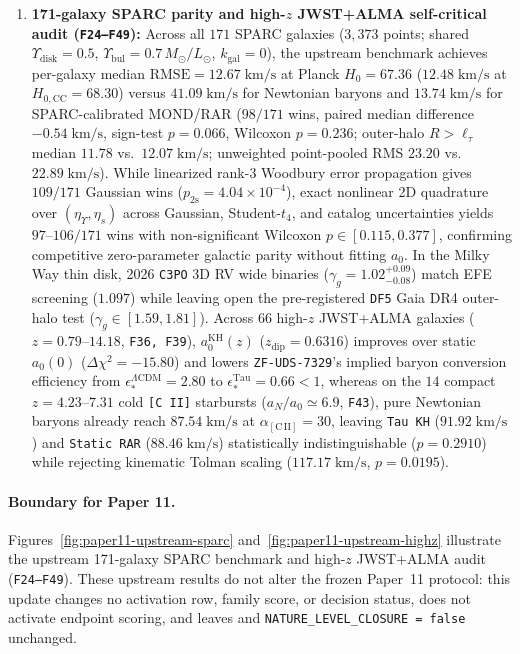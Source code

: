 \documentclass[11pt]{article}
\begin{document}
\begin{enumerate}[leftmargin=1.8em]
\item \textbf{171-galaxy SPARC parity and high-$z$ JWST+ALMA self-critical audit (\texttt{F24--F49}):}
Across all $171$ SPARC galaxies ($3{,}373$ points; shared $\Upsilon_{\mathrm{disk}}=0.5$, $\Upsilon_{\mathrm{bul}}=0.7\,M_\odot/L_\odot$, $k_{\mathrm{gal}}=0$), the upstream benchmark achieves per-galaxy median $\mathrm{RMSE}=12.67\;\mathrm{km/s}$ at Planck $H_0=67.36$ ($12.48\;\mathrm{km/s}$ at $H_{0,\mathrm{CC}}=68.30$) versus $41.09\;\mathrm{km/s}$ for Newtonian baryons and $13.74\;\mathrm{km/s}$ for SPARC-calibrated MOND/RAR ($98/171$ wins, paired median difference $-0.54\;\mathrm{km/s}$, sign-test $p=0.066$, Wilcoxon $p=0.236$; outer-halo $R>\ell_\tau$ median $11.78$ vs.\ $12.07\;\mathrm{km/s}$; unweighted point-pooled RMS $23.20$ vs.\ $22.89\;\mathrm{km/s}$). While linearized rank-3 Woodbury error propagation gives $109/171$ Gaussian wins ($p_{2\mathrm{s}}=4.04\times 10^{-4}$), exact nonlinear 2D quadrature over $(\eta_\Upsilon,\eta_s)$ across Gaussian, Student-$t_4$, and catalog uncertainties yields $97\text{--}106/171$ wins with non-significant Wilcoxon $p\in[0.115,0.377]$, confirming competitive zero-parameter galactic parity without fitting $a_0$. In the Milky Way thin disk, 2026 \texttt{C3PO} 3D RV wide binaries ($\gamma_g=1.02^{+0.09}_{-0.08}$) match EFE screening ($1.097$) while leaving open the pre-registered \texttt{DF5} Gaia DR4 outer-halo test ($\gamma_g\in[1.59,1.81]$). Across $66$ high-$z$ JWST+ALMA galaxies ($z=0.79\text{--}14.18$, \texttt{F36, F39}), $a_0^{\mathrm{KH}}(z)$ ($z_{\mathrm{dip}}=0.6316$) improves over static $a_0(0)$ ($\Delta\chi^2=-15.80$) and lowers \texttt{ZF-UDS-7329}'s implied baryon conversion efficiency from $\epsilon_*^{\Lambda\mathrm{CDM}}=2.80$ to $\epsilon_*^{\mathrm{Tau}}=0.66<1$, whereas on the $14$ compact $z=4.23\text{--}7.31$ cold \texttt{[C II]} starbursts ($a_N/a_0\simeq 6.9$, \texttt{F43}), pure Newtonian baryons already reach $87.54\;\mathrm{km/s}$ at $\alpha_{\mathrm{[C\,II]}}=30$, leaving \texttt{Tau KH} ($91.92\;\mathrm{km/s}$) and \texttt{Static RAR} ($88.46\;\mathrm{km/s}$) statistically indistinguishable ($p=0.2910$) while rejecting kinematic Tolman scaling ($117.17\;\mathrm{km/s}$, $p=0.0195$).
\end{enumerate}

\paragraph{Boundary for Paper 11.}
Figures~\ref{fig:paper11-upstream-sparc} and~\ref{fig:paper11-upstream-highz} illustrate the upstream 171-galaxy SPARC benchmark and high-$z$ JWST+ALMA audit (\texttt{F24--F49}). These upstream results do not alter the frozen Paper~11 protocol: this update changes no activation row, family score, or decision status, does not activate endpoint scoring, and leaves  and \texttt{NATURE\_LEVEL\_CLOSURE = false} unchanged.
\end{document}
